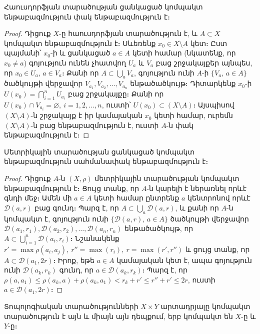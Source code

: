 \documentclass[./main.tex]{subfiles}
\begin{document}
\begin{theorem}\label{ch16thm5} 
Հաուսդորֆյան տարածության ցանկացած կոմպակտ են\-թա\-բազ\-մու\-թյուն փակ ենթաբազմություն է։
\end{theorem} 
\begin{proof}
Դիցուք $X$-ը հաուսդորֆյան տարածություն է, և $A\subset X$ կոմպակտ ենթաբազմություն է։ Սևեռենք $x_0 \in X\setminus A$ կետ։ Ըստ պայմանի՝ $x_0$-ի և ցանկա\-ցած $a\in A$ կետի համար (նկատենք, որ $x_0\neq a$) գոյություն ունեն չհատվող $U_a$ և $V_a$ բաց շրջակայքեր այնպես, որ $x_0 \in U_a,\, a \in V_a$։ Քանի որ $A\subset \bigcup\limits_a V_a$, գոյություն ունի $A$-ի $\{V_a,\, a\in A\}$ ծածկույթի վերջավոր $V_{a_1},V_{a_2},\dots,V_{a_n}$ ենթածածկույթ։ Դիտարկենք $x_0\textrm{-ի}$ ${U(x_0)=\bigcap\limits_{i=1}^nU_{a_i}}$  բաց շրջակայքը։ Քանի որ $U(x_0)\cap V_{a_i}=\varnothing, \ i=1,2,\dots,n$, ուստի՝ $U(x_0)\subset (X\setminus A)$։ Այսպիսով $(X\setminus A)$-ն շրջակայք է իր կամայական $x_0$ կետի համար, ուրեմն $(X\setminus A)$-ն բաց ենթաբազմություն է, ուստի $A$-ն փակ ենթաբազմություն է։
\end{proof}

\begin{theorem}\label{ch16thm6}
Մետրիկային տարածության ցանկացած կոմպակտ ենթաբազմու\-թյուն սահմանափակ ենթաբազմու\-թյուն է։
\end{theorem} 

\begin{proof}
Դիցուք $A$-ն $(X,\rho)$ մետրիկային տարածության կոմպակտ են\-թա\-բազ\-մու\-թյուն է։ Ցույց տանք, որ $A$-ն կարելի է ներառնել որևէ գնդի մեջ։ Ամեն մի ${a\in A}$ կետի համար ընտրենք $a$ կենտրոնով որևէ $\mathcal{D}(a,r)$ բաց գունդ։ Պարզ է, որ ${A\subset \bigcup\limits_a \mathcal{D}(a,r)}$, և քանի որ $A$-ն կոմպակտ է, գոյություն ունի ${\{\mathcal{D}(a,r),\, a\in A\} }$ ծած\-կույթի վերջավոր $\mathcal{D} (a_1,r_1), \mathcal{D}(a_2,r_2 ),\dots,\mathcal{D}(a_n,r_n)$ ենթածածկույթ, որ $A\subset {\bigcup\limits_{i=1}^n \mathcal{D}(a_i,r_i)}$։ Նշանակենք $r'=\max \rho(a_i,a_j),\ r''=\max(r_i),\ r=\max(r',r'')$ և ցույց տանք, որ $A\subset \mathcal{D}(a_1,2r)$։ Իրոք, եթե $a\in A$ կամայական կետ է, ապա գոյություն ունի $\mathcal{D}(a_k,r_k )$ գունդ, որ $a\in \mathcal{D}(a_k,r_k)$։ Պարզ է, որ $\rho(a,a_1)\leq \rho(a_k,a)+\rho(a_k,a_1)<r_k+r' \leq r''+r'\leq 2r $, ուստի $a\in \mathcal{D}(a_1,2r)$։
\end{proof}

\begin{theorem}\label{ch16thm7}
Տոպոլոգիական տարածությունների $X\times Y$ արտադրյալը կոմպակտ տարածություն է այն և միայն այն դեպքում, երբ կոմպակտ են $X$-ը և $Y$-ը։
\end{theorem}
\end{document}
